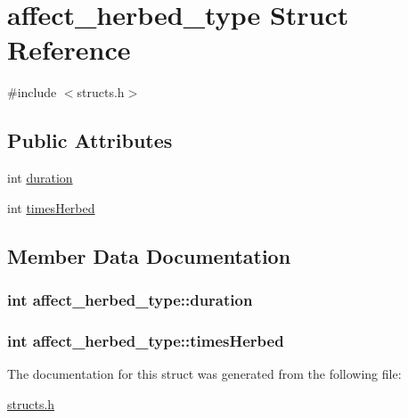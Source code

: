 \hypertarget{structaffect__herbed__type}{\section{affect\-\_\-herbed\-\_\-type Struct Reference}
\label{structaffect__herbed__type}
}


{\ttfamily \#include $<$structs.\-h$>$}

\subsection*{Public Attributes}
\begin{DoxyCompactItemize}
\item 
int \hyperlink{structaffect__herbed__type_acea05e493a57044623c02995d0408b81}{duration}
\item 
int \hyperlink{structaffect__herbed__type_a1537420273791ad16b7c433a7dbd1e3d}{times\-Herbed}
\end{DoxyCompactItemize}


\subsection{Member Data Documentation}
\hypertarget{structaffect__herbed__type_acea05e493a57044623c02995d0408b81}{
\subsubsection[{duration}]{\setlength{\rightskip}{0pt plus 5cm}int affect\-\_\-herbed\-\_\-type\-::duration}}\label{structaffect__herbed__type_acea05e493a57044623c02995d0408b81}
\hypertarget{structaffect__herbed__type_a1537420273791ad16b7c433a7dbd1e3d}{
\subsubsection[{times\-Herbed}]{\setlength{\rightskip}{0pt plus 5cm}int affect\-\_\-herbed\-\_\-type\-::times\-Herbed}}\label{structaffect__herbed__type_a1537420273791ad16b7c433a7dbd1e3d}


The documentation for this struct was generated from the following file\-:\begin{DoxyCompactItemize}
\item 
\hyperlink{structs_8h}{structs.\-h}\end{DoxyCompactItemize}
